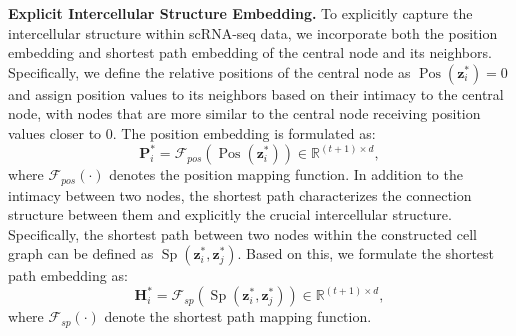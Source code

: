 \smallskip\noindent\textbf{Explicit Intercellular Structure Embedding.}
To explicitly capture the intercellular structure within scRNA-seq data, we incorporate both the position embedding and shortest path embedding of the central node and its neighbors. Specifically, we define the relative positions of the central node as $\operatorname{Pos}(\bm{z}_i^*)=0$ and assign position values to its neighbors based on their intimacy to the central node, with nodes that are more similar to 
the central node receiving position values closer to 0. The position embedding is formulated as:
\begin{equation}
    \bm{P}_i^*=\mathcal{F}_{pos}(\operatorname{Pos}(\bm{z}_i^*))\in\mathbb{R}^{(t+1)\times d},
\end{equation}
where $\mathcal{F}_{pos}(\cdot)$ denotes the position mapping function. In addition to the intimacy between two nodes, the shortest path characterizes the connection structure between them and explicitly the crucial intercellular structure. Specifically, the shortest path between two nodes within the constructed cell graph can be defined as $\operatorname{Sp}(\bm{z}_i^*,\bm{z}_j^*)$. Based on this, we formulate the shortest path embedding as:
\begin{equation}
    \bm{H}_i^*=\mathcal{F}_{sp}(\operatorname{Sp}(\bm{z}_i^*,\bm{z}_j^*))\in\mathbb{R}^{(t+1)\times d},
\end{equation}
where $\mathcal{F}_{sp}(\cdot)$ denote the shortest path mapping function.






